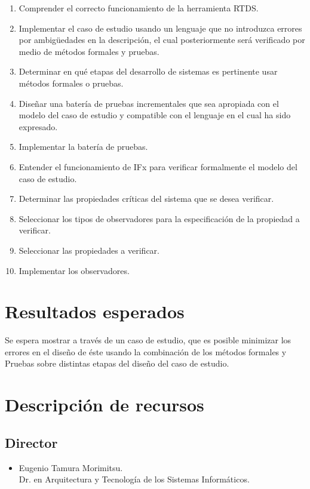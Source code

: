 \begin{enumerate}
\item Comprender el correcto funcionamiento de la herramienta RTDS.
\item Implementar el caso de estudio usando un lenguaje que no introduzca 
errores por ambig\"uedades en la descripci\'on, el cual posteriormente ser\'a 
verificado por medio de m\'etodos formales y pruebas.
\item Determinar en qu\'e etapas del desarrollo de sistemas es pertinente usar 
m\'etodos formales o pruebas.
\item Dise\~nar una bater\'ia de pruebas incrementales que sea apropiada con 
el modelo del caso de estudio y compatible con el lenguaje en el cual ha sido 
expresado.
\item Implementar la bater\'ia de pruebas.
\item Entender el funcionamiento de IFx para verificar formalmente el modelo 
del caso de estudio.
\item Determinar las propiedades cr\'iticas del sistema que se desea verificar.
\item Seleccionar los tipos de observadores para la especificaci\'on de la 
propiedad a verificar.
\item Seleccionar las propiedades a verificar.
\item Implementar los observadores.
\end{enumerate}


\section{Resultados esperados}

Se espera mostrar a trav\'es de un caso de estudio, que es posible minimizar los 
errores en el dise\~no de \'este usando la combinaci\'on de los m\'etodos 
formales y Pruebas sobre distintas etapas del dise\~no del caso de estudio.

\section{Descripci\'on de recursos}

\subsection{Director}

\begin{itemize}
 \item Eugenio Tamura Morimitsu.\\
 Dr. en Arquitectura y Tecnolog\'ia de los Sistemas Inform\'aticos.
 
\end{itemize}

